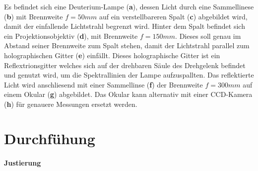 Es befindet sich eine Deuterium-Lampe (\textbf{a}), dessen Licht durch eine Sammellinese (\textbf{b}) mit Brennweite $f = 50mm$ auf ein verstellbareren Spalt (\textbf{c}) abgebildet wird, damit der einfallende Lichtstrahl begrenzt wird. 
Hinter dem Spalt befindet sich ein Projektionsobjektiv (\textbf{d}), mit Brennweite $f = 150mm$. 
Dieses soll genau im Abstand seiner Brennweite zum Spalt stehen, damit der Lichtstrahl parallel zum holographischen Gitter (\textbf{e}) einfällt. 
Dieses holographische Gitter ist ein Reflextrionsgitter welches sich auf der drehbaren Säule des Drehgelenk befindet und genutzt wird, um die Spektrallinien der Lampe aufzuspallten. 
Das reflektierte Licht wird anschliesend mit einer Sammellinse (\textbf{f}) der Brennweite $f=300mm$ auf einem Okular (\textbf{g}) abgebildet.
Das Okular kann alternativ mit einer CCD-Kamera (\textbf{h}) für genauere Messungen ersetzt werden.

\section{Durchfühung}

\paragraph{Justierung}

